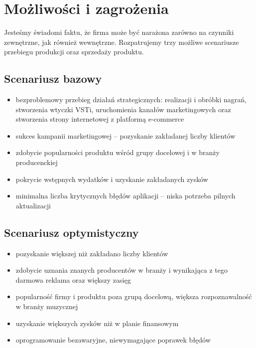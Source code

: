 \documentclass[12pt]{article}
\begin{document}
\section{Możliwości i zagrożenia}


Jesteśmy świadomi faktu, że firma może być narażona zarówno na czynniki zewnętrzne, jak również wewnętrzne.
Rozpatrujemy trzy możliwe scenariusze przebiegu produkcji oraz sprzedaży produktu.

\subsection{Scenariusz bazowy}

\begin{itemize}
    \item bezproblemowy przebieg działań strategicznych: realizacji i obróbki nagrań, stworzenia wtyczki VSTi, uruchomienia kanałów marketingowych oraz stworzenia strony internetowej z platformą e-commerce
    \item sukces kampanii marketingowej -- pozyskanie zakładanej liczby klientów
    \item zdobycie popularności produktu wśród grupy docelowej i w branży producenckiej
    \item pokrycie wstępnych wydatków i uzyskanie zakładanych zysków
    \item minimalna liczba krytycznych błędów aplikacji -- niska potrzeba pilnych aktualizacji
\end{itemize}

\subsection{Scenariusz optymistyczny}

\begin{itemize}
    \item pozyskanie większej niż zakładano liczby klientów
    \item zdobycie uznania znanych producentów w branży i wynikająca z tego darmowa reklama oraz większy zasięg
    \item popularność firmy i produktu poza grupą docelową, większa rozpoznawalność w branży muzycznej
    \item uzyskanie większych zysków niż w planie finansowym
    \item oprogramowanie bezawaryjne, niewymagające poprawek błędów
\end{itemize}
\end{document}

